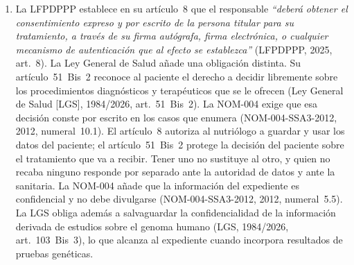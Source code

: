 \documentclass[12pt, a4paper]{article}
\begin{document}
\begin{enumerate}[label=\Roman*.]
  \item La LFPDPPP establece en su artículo~8 que el responsable
  \textit{``deberá obtener el consentimiento expreso y por
  escrito de la persona titular para su tratamiento, a través
  de su firma autógrafa, firma electrónica, o cualquier mecanismo
  de autenticación que al efecto se establezca''} (LFPDPPP, 2025,
   art.~8). La Ley General de Salud añade una obligación distinta.
  Su artículo~51~Bis~2 reconoce al paciente el derecho a decidir
  libremente sobre los procedimientos diagnósticos y terapéuticos que se
  le ofrecen (Ley General de Salud [LGS], 1984/2026, art.~51~Bis~2). La
  NOM-004 exige que esa decisión conste por escrito en los casos que
  enumera (NOM-004-SSA3-2012, 2012, numeral~10.1).
  El artículo~8 autoriza al nutriólogo a guardar y usar
  los datos del paciente; el artículo~51~Bis~2 protege la decisión
  del paciente sobre el tratamiento que va a recibir. Tener uno no
  sustituye al otro, y quien no recaba ninguno responde por
  separado ante la autoridad de datos y ante la sanitaria. La
  NOM-004 añade que la información del expediente es confidencial
  y no debe divulgarse (NOM-004-SSA3-2012, 2012, numeral~5.5). La
  LGS obliga además a salvaguardar la confidencialidad de la
  información derivada de estudios sobre el genoma humano (LGS,
  1984/2026, art.~103~Bis~3), lo que alcanza al expediente cuando
  incorpora resultados de pruebas genéticas.
 

\end{enumerate}
\end{document}
